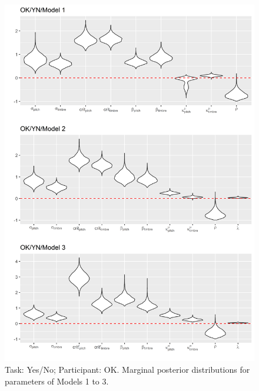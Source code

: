 \documentclass{article}\usepackage{knitr}
\begin{document}
\begin{figure}[H]
\centering
\includegraphics[scale=0.75, angle = 0]{Analysis_of_Human_Data/OK_YN_Basic_models}
\caption{Task: Yes/No; Participant: OK. Marginal posterior distributions for parameters of Models 1 to 3.}
\label{fig:OK_YN_Basic_models}
\end{figure}
\end{document}
